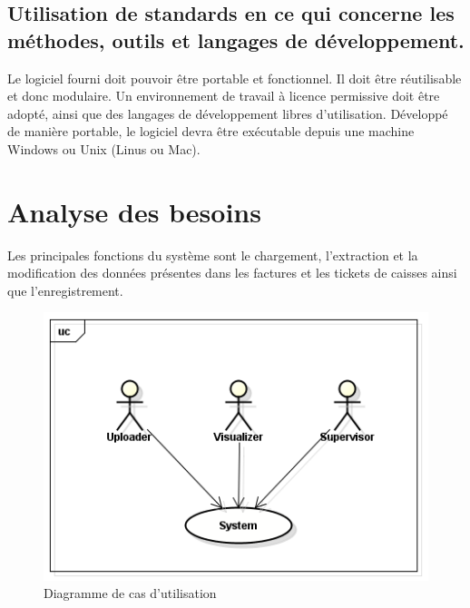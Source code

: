 \subsection{Utilisation de standards en ce qui concerne les méthodes, outils et langages de développement.}
Le logiciel fourni doit pouvoir être portable et fonctionnel. Il doit être réutilisable et donc modulaire. Un environnement de travail à licence permissive doit être adopté, ainsi que des langages de développement libres d’utilisation.
Développé de manière portable, le logiciel devra être exécutable depuis une machine Windows ou Unix (Linus ou Mac).


\section{Analyse des besoins}
Les principales fonctions du système sont le chargement, l'extraction et la modification des données présentes dans les factures et les tickets de caisses ainsi que l'enregistrement.
\begin{figure}[h]
	\begin{center}
			\includegraphics[scale = 0.5]{img/usecase.png}
	\end{center}
	\caption{Diagramme de cas d'utilisation}
	\label{usecase}
\end{figure}

\newpage

